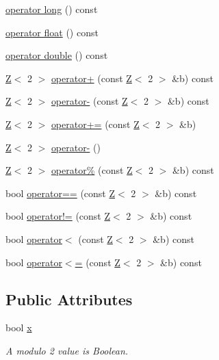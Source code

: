 \begin{DoxyCompactItemize}
\item 
\hyperlink{classZ_3_012_01_4_a84e96e6a70766a5c2e82bad32bb3892b}{operator long} () const
\item 
\hyperlink{classZ_3_012_01_4_a1445b41ddb6be805e59067adaaa45294}{operator float} () const
\item 
\hyperlink{classZ_3_012_01_4_afc37211cc313fbcf3577916c70661283}{operator double} () const
\item 
\hyperlink{classZ}{Z}$<$ 2 $>$ \hyperlink{classZ_3_012_01_4_acb91754a2634eee60b51ea29b8cfe347}{operator+} (const \hyperlink{classZ}{Z}$<$ 2 $>$ \&b) const
\item 
\hyperlink{classZ}{Z}$<$ 2 $>$ \hyperlink{classZ_3_012_01_4_a4a983a0acbe231f84fdc948c64996a55}{operator-\/} (const \hyperlink{classZ}{Z}$<$ 2 $>$ \&b) const
\item 
\hyperlink{classZ}{Z}$<$ 2 $>$ \hyperlink{classZ_3_012_01_4_abe24998e8f1ba064141ad5f3d04fb7e1}{operator+=} (const \hyperlink{classZ}{Z}$<$ 2 $>$ \&b)
\item 
\hyperlink{classZ}{Z}$<$ 2 $>$ \hyperlink{classZ_3_012_01_4_a72004bd105e0df1330f7c1f61919b9dd}{operator-\/} ()
\item 
\hyperlink{classZ}{Z}$<$ 2 $>$ \hyperlink{classZ_3_012_01_4_a665bdbcbcf9b9787d7bcf40c6a716ec3}{operator\%} (const \hyperlink{classZ}{Z}$<$ 2 $>$ \&b) const
\item 
bool \hyperlink{classZ_3_012_01_4_a98508d39c9695bdda292044170ef5718}{operator==} (const \hyperlink{classZ}{Z}$<$ 2 $>$ \&b) const
\item 
bool \hyperlink{classZ_3_012_01_4_a0003dbeab72988aea1e4b8034f5fa29d}{operator!=} (const \hyperlink{classZ}{Z}$<$ 2 $>$ \&b) const
\item 
bool \hyperlink{classZ_3_012_01_4_aec8e51a2935d539f11220270f35c1c31}{operator$<$} (const \hyperlink{classZ}{Z}$<$ 2 $>$ \&b) const
\item 
bool \hyperlink{classZ_3_012_01_4_a6e1b77419935d4f017ffab84df3ca520}{operator$<$=} (const \hyperlink{classZ}{Z}$<$ 2 $>$ \&b) const
\end{DoxyCompactItemize}
\subsection*{Public Attributes}
\begin{DoxyCompactItemize}
\item 
bool \hyperlink{classZ_3_012_01_4_ae753e180f5d8aa55370a497e2c86fbb8}{x}
\begin{DoxyCompactList}\small\item\em A modulo 2 value is Boolean. \end{DoxyCompactList}\end{DoxyCompactItemize}
